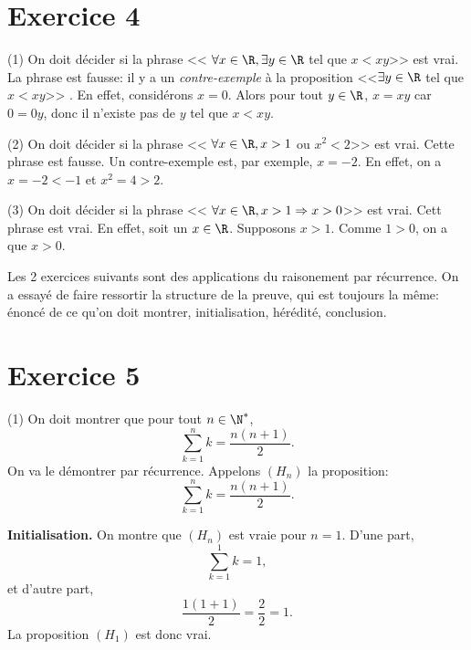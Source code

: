 \documentclass[12pt, a4paper,oneside]{article} %
\begin{document}
\section{Exercice 4}

(1) On doit décider si la phrase
<< $ \forall x \in \R, \exists y \in \R $
tel que $ x < xy $>>
est vrai.
La phrase est fausse:
il y a un \emph{contre-exemple}
à la proposition
<<$\exists y \in \R $
tel que $ x < xy $>>
.
En effet, considérons $ x=0 $.
Alors pour tout $ y \in \R $,
$ x = x y $ car $ 0 = 0y $,
donc il n'existe pas de $ y $
tel que $ x < xy $.

(2) On doit décider si la phrase
<< $ \forall x \in \R, 
x > 1$ ou $ x^2 < 2 $>>
est vrai.
Cette phrase est fausse.
Un contre-exemple est,
par exemple,
$ x = -2 $.
En effet, on a
$ x = -2 < -1 $
et $ x^2 = 4 > 2 $.

(3) On doit décider si la phrase
<< $ \forall x \in \R, 
x > 1 \Rightarrow x > 0 $>>
est vrai.
Cett phrase est vrai.
En effet, soit un $ x \in \R $.
Supposons $ x > 1 $.
Comme $ 1 > 0 $, on a que $ x > 0 $.

Les 2 exercices suivants
sont des applications
du raisonement par récurrence.
On a essayé de faire ressortir
la structure de la preuve,
qui est toujours la même:
énoncé de ce qu'on doit montrer,
initialisation, hérédité, conclusion.

\section{Exercice 5}

(1) On doit montrer que pour tout
$ n \in \N^{*} $,
\begin{equation}
	\sum_{k=1}^{n} k
	=
	\frac{n(n+1)}{2}
	.
\end{equation}
On va le démontrer par récurrence.
Appelons $ (H_{n}) $ la proposition:
\begin{equation}
	\sum_{k=1}^{n} k
	=
	\frac{n(n+1)}{2}
	.
\end{equation}

\textbf{Initialisation.}
On montre que $ (H_{n}) $
est vraie pour $ n=1 $.
D'une part,
\begin{equation}
	\sum_{k=1}^{1} k
	=
	1
	,
\end{equation}
et d'autre part,
\begin{equation}
	\frac{1(1+1)}{2}
	=
	\frac{2}{2}
	=
	1
	.
\end{equation}
La proposition $ (H_{1}) $ 
est donc vrai.
\end{document}
